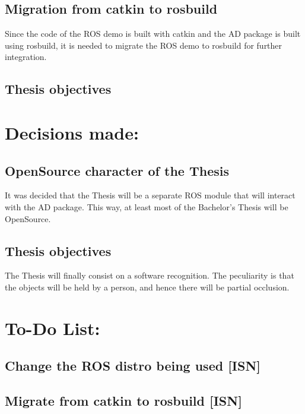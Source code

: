 \documentclass{article}
\newenvironment{myindentpar}[1]%
 {\begin{list}{}%
         {\setlength{\leftmargin}{#1}}%
         \item[]%
 }
 {\end{list}}
\begin{document}
	\subsection{Migration from catkin to rosbuild}
		\begin{myindentpar}{1cm} 
 		Since the code of the ROS demo is built with catkin and the AD package is built using rosbuild, it is needed to migrate the ROS demo to rosbuild for further integration. 
		\end{myindentpar}

	\subsection{Thesis objectives}
		


\section{\LARGE Decisions made:}

	\subsection{OpenSource character of the Thesis}
		\begin{myindentpar}{1cm} 
		It was decided that the Thesis will be a separate ROS module that will interact with the AD package. This way, at least most of the Bachelor's Thesis will be OpenSource. 
	
		\end{myindentpar}
	\subsection{Thesis objectives}
		\begin{myindentpar}{1cm} 
 		The Thesis will finally consist on a software recognition. The peculiarity is that the objects will be held by a person, and hence there will be partial occlusion. 
		\end{myindentpar}

\section{\LARGE To-Do List: }
	\subsection{Change the ROS distro being used [ISN]}
	\subsection{Migrate from catkin to rosbuild [ISN]}
\end{document}
